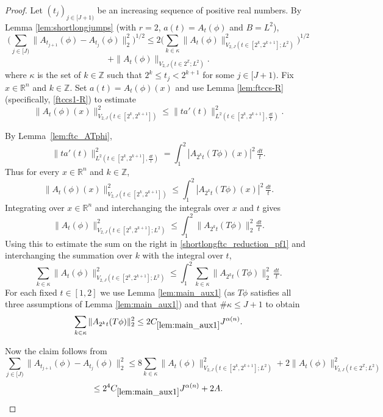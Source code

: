 \documentclass[12pt,reqno]{amsart}
\theoremstyle{plain}
\numberwithin{equation}{section}
\theoremstyle{remark}
\begin{document}
\begin{proof}
Let $(t_j)_{j\in[J+1)}$ be an increasing sequence of positive real numbers.
By Lemma \ref{lem:shortlongjumps} (with $r=2$, $a(t) = A_t(\phi)$ and $B=L^2$),
\begin{equation}\label{shortlongftc_reduction_pf1} \Big(\sum_{j\in [J)} \|A_{t_{j+1}}(\phi)- A_{t_j}(\phi)\|_2^2\Big)^{1/2} \le 2 \Big(\sum_{k\in \kappa} \|A_t(\phi)\|_{V_{2,J}(t\in [2^k, 2^{k+1}]; L^2)}^2\Big)^{1/2}
\end{equation}
\begin{equation}\label{shortlongftc_reduction_pf2}
+\|A_t(\phi)\|_{V_{2,J}(t\in 2^\mathbb{Z}; L^2)}.
\end{equation}
where $\kappa$ is the set of $k\in \mathbb{Z}$ such that $2^{k}\le t_j<2^{k+1}$ for some $j\in [J+1)$.
 Fix $x\in\mathbb{R}^n$ and $k\in\mathbb{Z}$. Set $a(t)=A_t(\phi)(x)$ and use Lemma \ref{lem:ftccs-R} (specifically, \eqref{ftccs1-R}) to estimate
 \[ \|A_t(\phi)(x)\|_{V_{2,J}(t\in [2^k, 2^{k+1}])}^2 \le
 \|ta'(t)\|_{L^2(t\in [2^k, 2^{k+1}],\tfrac{dt}{t})}^2.  \]


By Lemma~\ref{lem:ftc_ATphi},
\[ \|ta'(t)\|_{L^2(t\in [2^k, 2^{k+1}],\tfrac{dt}{t})}^2 = \int_{1}^2 |A_{2^k t}(T\phi)(x)|^2\,\tfrac{dt}{t}. \]
Thus for every $x\in\mathbb{R}^n$ and $k\in\mathbb{Z}$,
\[ \|A_t(\phi)(x)\|_{V_{2,J}(t\in [2^k, 2^{k+1}])}^2 \le\int_{1}^2 |A_{2^k t}(T\phi)(x)|^2\,\tfrac{dt}{t}.  \]
Integrating over $x\in\mathbb{R}^n$ and interchanging the integrals over $x$ and $t$ gives
\[ \|A_t(\phi)\|_{V_{2,J}(t\in [2^k, 2^{k+1}]; L^2)}^2 \le \int_1^2 \|A_{2^k t}(T\phi)\|_2^2 \tfrac{dt}{t}. \]
Using this to estimate the sum on the right in \eqref{shortlongftc_reduction_pf1} and interchanging the summation over $k$ with the integral over $t$,
\[
\sum_{k\in \kappa} \|A_t(\phi)\|_{V_{2,J}(t\in [2^k, 2^{k+1}]; L^2)}^2 \le \int_1^2 \sum_{k\in\kappa} \|A_{2^k t}(T\phi)\|_2^2\,\tfrac{dt}{t}.
\]
For each fixed $t\in [1,2]$ we use Lemma \ref{lem:main_aux1} (as $T\phi$ satisfies all three assumptions of Lemma \ref{lem:main_aux1}) and that $\#\kappa\le J+1$ to obtain
\[ \sum_{k\in\kappa} \|A_{2^k t}(T\phi)\|_2^2 \le 2 C_{\ref{lem:main_aux1}} J^{\alpha(n)}. \]

Now the claim follows from
\[ \sum_{j\in [J)} \|A_{t_{j+1}}(\phi)- A_{t_j}(\phi)\|_2^2 \le 8 \sum_{k\in \kappa} \|A_t(\phi)\|_{V_{2,J}(t\in [2^k, 2^{k+1}]; L^2)}^2 + 2 \|A_t(\phi)\|_{V_{2,J}(t\in 2^\mathbb{Z}; L^2)}^2 \]
\[ \le 2^4 C_{\ref{lem:main_aux1}} J^{\alpha(n)} + 2A.  \]
\end{proof}
\end{document}
